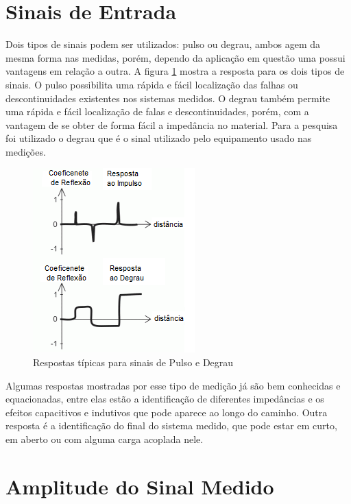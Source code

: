 \section{Sinais de Entrada}

Dois tipos de sinais podem ser utilizados: pulso ou degrau, ambos agem da mesma forma nas medidas, porém, dependo da aplicação em questão uma possui vantagens em relação a outra. A figura \ref{fig:respostas} mostra a resposta para os dois tipos de sinais. O pulso possibilita uma rápida e fácil localização das falhas ou descontinuidades existentes nos sistemas medidos. O degrau também permite uma rápida e fácil localização de falas e descontinuidades, porém, com a vantagem de se obter de forma fácil a impedância no material. Para a pesquisa foi utilizado o degrau que é o sinal utilizado pelo equipamento usado nas medições.

\begin{figure}[htb!]
	\begin{center}
		\includegraphics[scale=.9]{./cap2/figuras/tdr_response.png}
		\caption{Respostas típicas para sinais de Pulso e Degrau }
		\label{fig:respostas}
	\end{center}
\end{figure}

Algumas respostas mostradas por esse tipo de medição já são bem conhecidas e equacionadas, entre elas estão a identificação de diferentes impedâncias e os efeitos capacitivos e indutivos que pode aparece ao longo do caminho. Outra resposta é a identificação do final do sistema medido, que pode estar em curto, em aberto ou com alguma carga acoplada nele. 

\section{Amplitude do Sinal Medido}

